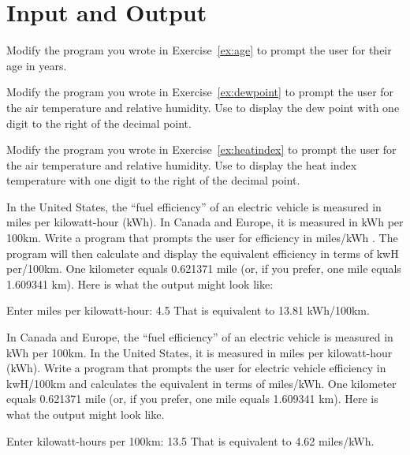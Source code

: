 \chapter{Input and Output}

\begin{exercise}
Modify the program you wrote in Exercise~\ref{ex:age} to prompt the user for their age in years.
\end{exercise}

\begin{exercise}
Modify the program you wrote in Exercise~\ref{ex:dewpoint} to prompt the user for the air temperature and relative humidity. Use  to display the dew point with one digit to the right of the decimal point.
\end{exercise}

\begin{exercise}
Modify the program you wrote in Exercise~\ref{ex:heatindex} to prompt the user for the air temperature and relative humidity. Use  to display the heat index temperature with one digit to the right of the decimal point.
\end{exercise}

\begin{exercise}
\label{ex:electricvehicle1}
In the United States, the ``fuel efficiency'' of an electric vehicle is measured in miles per kilowatt-hour (kWh). In Canada and Europe, it is measured in kWh per 100km. Write a program that prompts the user for efficiency in miles/kWh . The program will then calculate and display the equivalent efficiency in terms of kwH per/100km. One kilometer equals 0.621371 mile (or, if you prefer, one mile equals 1.609341 km). Here is what the output might look like:

\begin{stdout}
Enter miles per kilowatt-hour: 4.5
That is equivalent to 13.81 kWh/100km.
\end{stdout}

\end{exercise}

\begin{exercise}
\label{ex:electricvehicle2}
In Canada and Europe, the ``fuel efficiency'' of an electric vehicle is measured in kWh per 100km. In the United States, it is measured in miles per kilowatt-hour (kWh).  Write a program that prompts the user for electric vehicle efficiency in kwH/100km and calculates the equivalent in terms of miles/kWh.  One kilometer equals 0.621371 mile (or, if you prefer, one mile equals 1.609341 km). Here is what the output might look like.

\begin{stdout}
Enter kilowatt-hours per 100km: 13.5
That is equivalent to 4.62 miles/kWh.
\end{stdout}
\end{exercise}


